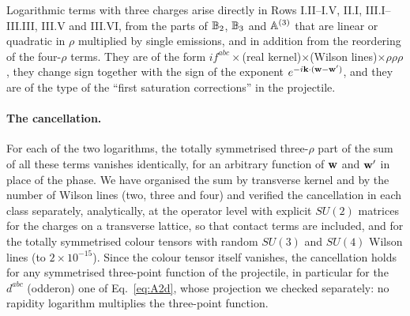 Logarithmic terms with three charges arise directly in Rows I.II--I.V, II.I, III.I--III.III, III.V and III.VI, from the parts of $\mathbb{B}_2$, $\mathbb{B}_3$ and $\mathbb{A}^{(3)}$ that are linear or quadratic in $\rho$ multiplied by single emissions, and in addition from the reordering of the four-$\rho$ terms. They are of the form $if^{abc}\times$(real kernel)$\times$(Wilson lines)$\times\rho\rho\rho$, they change sign together with the sign of the exponent $e^{-i\mathbf{k}\cdot(\mathbf{w}-\mathbf{w}')}$, and they are of the type of the ``first saturation corrections'' in the projectile.

\paragraph{The cancellation.} For each of the two logarithms, the totally symmetrised three-$\rho$ part of the sum of all these terms vanishes identically, for an arbitrary function of $\mathbf{w}$ and $\mathbf{w}'$ in place of the phase. We have organised the sum by transverse kernel and by the number of Wilson lines (two, three and four) and verified the cancellation in each class separately, analytically, at the operator level with explicit $SU(2)$ matrices for the charges on a transverse lattice, so that contact terms are included, and for the totally symmetrised colour tensors with random $SU(3)$ and $SU(4)$ Wilson lines (to $2\times10^{-15}$). Since the colour tensor itself vanishes, the cancellation holds for any symmetrised three-point function of the projectile, in particular for the $d^{abc}$ (odderon) one of Eq.~\eqref{eq:A2d}, whose projection we checked separately: no rapidity logarithm multiplies the three-point function. 

